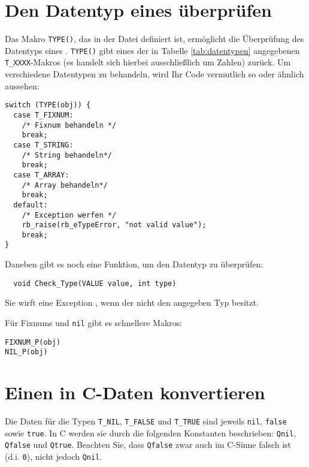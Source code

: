 \section{Den Datentyp eines \VALUEs überprüfen}
\label{sec:pruefen}

Das Makro \verb+TYPE()+, das in der Datei  definiert ist,
ermöglicht die Überprüfung des Datentyps eines \VALUEs. \verb+TYPE()+
gibt eines der in Tabelle \ref{tab:datentypen} angegebenen
\verb+T_XXXX+-Makros (es handelt sich hierbei ausschließlich um
Zahlen) zurück. Um verschiedene Datentypen zu behandeln, wird Ihr Code
vermutlich so oder ähnlich aussehen:

\begin{lstlisting}
switch (TYPE(obj)) {
  case T_FIXNUM:
    /* Fixnum behandeln */
    break;
  case T_STRING:
    /* String behandeln*/
    break;
  case T_ARRAY:
    /* Array behandeln*/
    break;
  default:
    /* Exception werfen */
    rb_raise(rb_eTypeError, "not valid value");
    break;
}
\end{lstlisting}

Daneben gibt es noch eine Funktion, um den Datentyp zu überprüfen:

\begin{lstlisting}
  void Check_Type(VALUE value, int type)
\end{lstlisting}

\noindent Sie wirft eine Exception , wenn der \VALUE nicht den angegeben Typ besitzt.

Für Fixnums und \verb+nil+ gibt es schnellere Makros:

\begin{lstlisting}
FIXNUM_P(obj)
NIL_P(obj)
\end{lstlisting}


\section{Einen \VALUE in C-Daten konvertieren}
\label{sec:value2c}

Die Daten für die Typen \verb+T_NIL+, \verb+T_FALSE+ und \verb+T_TRUE+
sind jeweils \verb+nil+, \verb+false+ sowie \verb+true+. In C werden
sie durch die folgenden Konstanten beschrieben: \verb+Qnil+,
\verb+Qfalse+ und \verb+Qtrue+. Beachten Sie, dass \verb+Qfalse+ zwar
auch im C-Sinne falsch ist (d.i. \verb+0+), nicht jedoch \verb+Qnil+.

